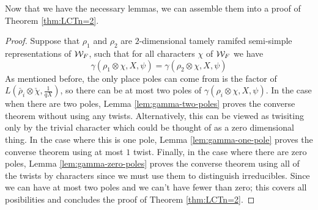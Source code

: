Now that we have the necessary lemmas, we can assemble them into a proof of Theorem \ref{thm:LCTn=2}.
\begin{proof}
  Suppose that $\rho_1$ and $\rho_2$ are $2$-dimensional tamely ramifed semi-simple representations of $\mathcal{W}_F$, such that for all characters $\chi$ of $\mathcal{W}_F$ we have
  \[\gamma(\rho_1 \otimes \chi,X,\psi) = \gamma(\rho_2 \otimes \chi, X, \psi)\]
  As mentioned before, the only place poles can come from is the factor of $L(\check{\rho_i} \otimes \check{\chi},\frac{1}{qX})$, so there can be at most two poles of $\gamma(\rho_i \otimes \chi, X, \psi)$.
  In the case when there are two poles, Lemma \ref{lem:gamma-two-poles} proves the converse theorem without using any twists.
  Alternatively, this can be viewed as twisiting only by the trivial character which could be thought of as a zero dimensional thing.
  In the case where this is one pole, Lemma \ref{lem:gamma-one-pole} proves the converse theorem using at most $1$ twist.
  Finally, in the case where there are zero poles, Lemma \ref{lem:gamma-zero-poles} proves the converse theorem using all of the twists by characters since we must use them to distinguish irreducibles.
  Since we can have at most two poles and we can't have fewer than zero; this covers all posibilities and concludes the proof of Theorem \ref{thm:LCTn=2}.
\end{proof}

\endinput
